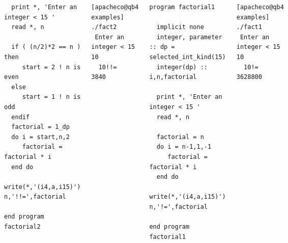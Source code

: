 \documentclass[slidestop,mathserif,compress,xcolor=svgnames]{beamer}
\newenvironment{eblock}[0]
{
\begin{beamerboxesrounded}[upper=uppercol2,lower=lowercol2,shadow=true]}
{\end{beamerboxesrounded}}
\newenvironment{beblock}[0]
{
\begin{beamerboxesrounded}[upper=uppercol3,lower=lowercol3,shadow=true]}
{\end{beamerboxesrounded}}
\begin{document}
\begin{frame}
\begin{columns}
\begin{eblock}{}
{\begin{verbatim}
  print *, 'Enter an integer < 15 '
  read *, n

  if ( (n/2)*2 == n ) then
     start = 2 ! n is even
  else
     start = 1 ! n is odd
  endif
  factorial = 1_dp
  do i = start,n,2
     factorial = factorial * i
  end do
  write(*,'(i4,a,i15)') n,'!!=',factorial

end program factorial2
    \end{verbatim}
    }
    \end{eblock}
    \begin{beblock}{}
      {\fontsize{5}{6}
        \begin{verbatim}
[apacheco@qb4 examples] ./fact2
 Enter an integer < 15 
10
  10!!=           3840
        \end{verbatim}
      }
    \end{beblock}
    \column{5.5cm}
    \begin{eblock}{}
    {\fontsize{5}{6}
    \begin{verbatim}
program factorial1

  implicit none
  integer, parameter :: dp = selected_int_kind(15)
  integer(dp) :: i,n,factorial

  print *, 'Enter an integer < 15 '
  read *, n

  factorial = n
  do i = n-1,1,-1
     factorial = factorial * i
  end do
  write(*,'(i4,a,i15)') n,'!=',factorial

end program factorial1
    \end{verbatim}
    }
    \end{eblock}
    \vspace{0.93cm}
    \begin{beblock}{}
      {\fontsize{5}{6}
        \begin{verbatim}
[apacheco@qb4 examples] ./fact1
 Enter an integer < 15 
10
  10!=        3628800
        \end{verbatim}
      }
    \end{beblock}
  \end{columns}
\end{frame}
\end{document}
